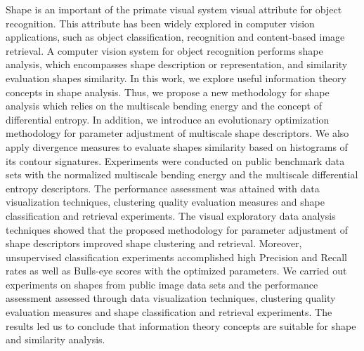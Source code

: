 
 Shape is an important of the primate visual system visual attribute for object recognition. This attribute has been widely explored in computer vision applications, such as object classification, recognition and content-based image retrieval. A computer vision system for object recognition performs shape analysis, which encompasses shape description or representation, and similarity evaluation shapes similarity. In this work, we explore useful information theory concepts in shape analysis. Thus, we propose a new methodology for shape analysis which relies on the multiscale bending energy and the concept of differential entropy. In addition, we introduce an evolutionary optimization methodology for parameter adjustment of multiscale shape descriptors. We also apply divergence measures to evaluate shapes similarity based on histograms of its contour signatures.
Experiments were conducted on public benchmark data sets with the normalized multiscale bending energy and the multiscale differential entropy descriptors.  The  performance assessment was attained with data visualization techniques, clustering quality evaluation measures and shape classification and retrieval experiments.
The visual exploratory data analysis techniques showed that the proposed methodology for parameter adjustment of shape descriptors  improved shape clustering and retrieval. Moreover, unsupervised classification experiments accomplished high Precision and Recall rates as well as Bulls-eye scores with the optimized parameters.  
 We carried out experiments on shapes from public image data sets  and the performance assessment assessed through data visualization techniques, clustering quality evaluation measures and shape classification and retrieval experiments. The results led us to conclude that information theory concepts are suitable for shape and similarity analysis. 

